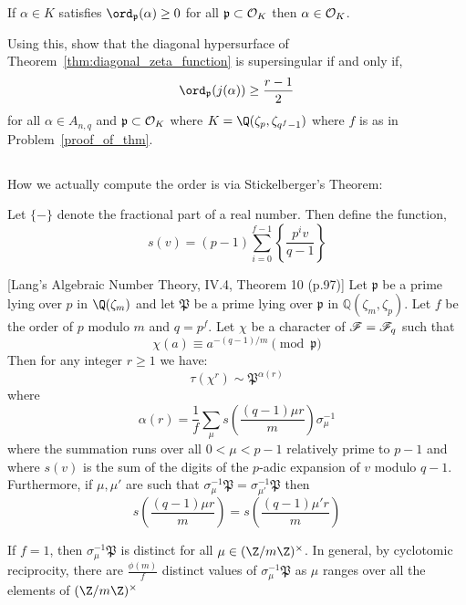 \documentclass[12pt]{article}
\begin{document}
\begin{lemma}
If $\alpha \in K$ satisfies $\ord_{\p}(\alpha) \ge 0$ for all $\mathfrak{p} \subset \mathcal{O}_{K}$ then $\alpha \in \mathcal{O}_{K}$.
\end{lemma}

Using this, show that the diagonal hypersurface of Theorem~\ref{thm:diagonal_zeta_function} is supersingular if and only if,
\[ \ord_{\p}(j(\alpha)) \ge \frac{r-1}{2} \]
for all $\alpha \in A_{n, q}$ and $\mathfrak{p} \subset \mathcal{O}_{K}$ where $K = \Q(\zeta_p, \zeta_{q^f-1})$ where $f$ is as in Problem~\ref{proof_of_thm}.

\subsection{}

How we actually compute the order is via Stickelberger's Theorem:


\begin{defn}
Let $\{ - \}$ denote the fractional part of a real number. Then define the function,
\[ s\left( v \right) = (p-1) \sum_{i = 0}^{f-1} \left\{ \frac{p^i v}{q - 1} \right\} \]
\end{defn}


\begin{theorem} \label{thm:gauss_fact_lang}[Lang's Algebraic Number Theory, IV.4, Theorem 10 (p.97)]
Let $\mathfrak{p}$ be a prime lying over $p$ in $\Q(\zeta_{m})$ and let $\mathfrak{P}$ be a prime lying over $\mathfrak{p}$ in $\mathbb{Q}(\zeta_{m}, \zeta_p)$. Let $f$ be the order of $p$ modulo $m$ and $q = p^f$. Let $\chi$ be a character of $\mathscr{F}=\mathscr{F}_q$ such that
\[\chi(a) \equiv a^{-(q-1)/m} \pmod{\mathfrak{p}}\]
Then for any integer $r \ge 1$ we have:
\[\tau\left(\chi^r\right) \sim \mathfrak{P}^{\alpha(r)}\]
where 
\[\alpha(r) = \frac{1}{f}\sum_{\mu} s\left(\frac{(q-1)\mu r}{m}\right)\sigma_{\mu}^{-1}\]
where the summation runs over all $0 < \mu < p-1$ relatively prime to $p-1$ and where $s(v)$ is the sum of the digits of the $p$-adic expansion of $v$ modulo $q - 1$. Furthermore, if $\mu, \mu'$ are such that $\sigma_{\mu}^{-1}\mathfrak{P} = \sigma_{\mu'}^{-1}\mathfrak{P}$ then
\[s\left(\frac{(q-1)\mu r}{m}\right) = s\left(\frac{(q-1)\mu' r}{m}\right)\]
\end{theorem}


\begin{remark} If $f = 1$, then $\sigma_{\mu}^{-1} \mathfrak{P}$ is distinct for all $\mu\in(\Z/m\Z)^{\times}$. In general, by cyclotomic reciprocity, there are $\frac{\phi(m)}{f}$ distinct values of $\sigma_{\mu}^{-1} \mathfrak{P}$ as $\mu$ ranges over all the elements of $(\Z/m\Z)^{\times}$
\end{remark}
\end{document}
